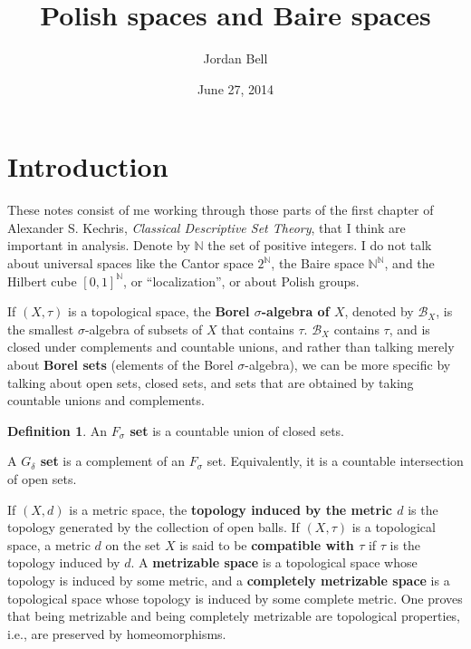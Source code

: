\documentclass{article}
\theoremstyle{definition}
\newtheorem{definition}[theorem]{Definition}
\begin{document}
\title{Polish spaces and Baire spaces}
\author{Jordan Bell}
\date{June 27, 2014}

\maketitle


\section{Introduction}
These notes consist of me working through those parts of the first chapter of Alexander S. Kechris, {\em Classical Descriptive Set Theory}, 
that I think are important in analysis. Denote by  $\mathbb{N}$ the set of positive integers.
I do not talk about universal spaces like the Cantor space $2^\mathbb{N}$, the Baire space $\mathbb{N}^\mathbb{N}$, and the
Hilbert cube $[0,1]^\mathbb{N}$, or ``localization'', or about Polish groups. 

If $(X,\tau)$ is a topological space, the \textbf{Borel $\sigma$-algebra of $X$},
denoted by $\mathscr{B}_X$, is the smallest $\sigma$-algebra of subsets of $X$ that contains $\tau$. 
$\mathscr{B}_X$ contains $\tau$, and is closed under complements and countable unions, and rather than talking merely about \textbf{Borel sets} (elements of the Borel $\sigma$-algebra),
we can be more specific by talking about open sets, closed sets, and sets that are obtained by taking countable unions and complements. 

\begin{definition}
An \textbf{$F_\sigma$ set}
is a countable union of closed sets.

A \textbf{$G_\delta$ set} is a complement of an $F_\sigma$ set. Equivalently, it is a countable intersection of open sets.
\end{definition}

If $(X,d)$ is a metric space, the \textbf{topology induced by the metric $d$} is the topology generated by the collection of open balls. 
If $(X,\tau)$ is a topological space, a metric $d$ on the set $X$ is said to be \textbf{compatible with $\tau$} if $\tau$ is the topology induced by $d$. A \textbf{metrizable
space} is a topological space whose topology is induced by some metric, and   a \textbf{completely metrizable space} is a topological space whose topology is induced by some
complete metric. One proves that being metrizable  and being completely metrizable are topological properties, i.e., are preserved by homeomorphisms.
\end{document}
